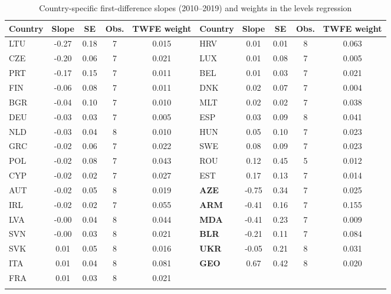 \documentclass[pdflatex,sn-basic]{sn-jnl}
\begin{document}
\begin{table}[h]
\caption{Country-specific first-difference slopes (2010--2019) and weights in the levels regression}\label{tab:S5}
\footnotesize
\begin{tabular*}{\textwidth}{@{\extracolsep{\fill}}lcccc|lcccc@{}}
\toprule
Country & Slope & SE & Obs. & TWFE weight & Country & Slope & SE & Obs. & TWFE weight\\
\midrule
LTU & -0.27 & 0.18 & 7 & 0.015 & HRV & 0.01 & 0.01 & 8 & 0.063\\
CZE & -0.20 & 0.06 & 7 & 0.021 & LUX & 0.01 & 0.08 & 7 & 0.005\\
PRT & -0.17 & 0.15 & 7 & 0.011 & BEL & 0.01 & 0.03 & 7 & 0.021\\
FIN & -0.06 & 0.08 & 7 & 0.011 & DNK & 0.02 & 0.07 & 7 & 0.004\\
BGR & -0.04 & 0.10 & 7 & 0.010 & MLT & 0.02 & 0.02 & 7 & 0.038\\
DEU & -0.03 & 0.03 & 7 & 0.005 & ESP & 0.03 & 0.09 & 8 & 0.041\\
NLD & -0.03 & 0.04 & 8 & 0.010 & HUN & 0.05 & 0.10 & 7 & 0.023\\
GRC & -0.02 & 0.06 & 7 & 0.022 & SWE & 0.08 & 0.09 & 7 & 0.023\\
POL & -0.02 & 0.08 & 7 & 0.043 & ROU & 0.12 & 0.45 & 5 & 0.012\\
CYP & -0.02 & 0.02 & 7 & 0.027 & EST & 0.17 & 0.13 & 7 & 0.014\\
AUT & -0.02 & 0.05 & 8 & 0.019 & \textbf{AZE} & -0.75 & 0.34 & 7 & 0.025\\
IRL & -0.02 & 0.02 & 7 & 0.055 & \textbf{ARM} & -0.41 & 0.16 & 7 & 0.155\\
LVA & -0.00 & 0.04 & 8 & 0.044 & \textbf{MDA} & -0.41 & 0.23 & 7 & 0.009\\
SVN & -0.00 & 0.03 & 8 & 0.021 & \textbf{BLR} & -0.21 & 0.11 & 7 & 0.084\\
SVK & 0.01 & 0.05 & 8 & 0.016 & \textbf{UKR} & -0.05 & 0.21 & 8 & 0.031\\
ITA & 0.01 & 0.04 & 8 & 0.081 & \textbf{GEO} & 0.67 & 0.42 & 8 & 0.020\\
FRA & 0.01 & 0.03 & 8 & 0.021 & & & & &\\
\botrule
\end{tabular*}
\end{table}
\end{document}
